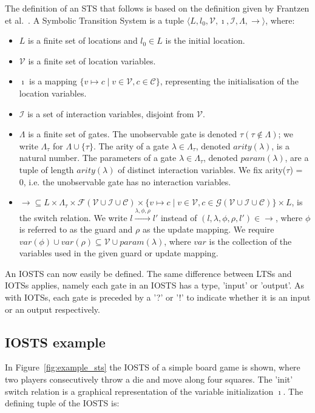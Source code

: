\begin{definition}
The definition of an STS that follows is based on the definition given by Frantzen et al.~\cite{Frantzen:Symbolic}. A Symbolic Transition System is a tuple $\langle L,l_0,\mathcal{V},\imath,\mathcal{I},\Lambda,\rightarrow\rangle$, where:
\begin{itemize}
\item $L$ is a finite set of locations and $l_0 \in L$ is the initial location.
\item $\mathcal{V}$ is a finite set of location variables.
\item $\imath$ is a mapping $\{v \mapsto c \mid v \in \mathcal{V}, c \in \mathcal{C}\}$, representing the initialisation of the location variables.
\item $\mathcal{I}$ is a set of interaction variables, disjoint from $\mathcal{V}$.
\item $\Lambda$ is a finite set of gates. The unobservable gate is denoted $\tau (\tau \notin \Lambda)$; we write $\Lambda_\tau$ for $\Lambda \cup \{\tau\}$. The arity of a gate $\lambda\in\Lambda_\tau$, denoted $arity(\lambda)$, is a natural number. The parameters of a gate $\lambda\in\Lambda_\tau$, denoted $param(\lambda)$, are a tuple of length $arity(\lambda)$ of distinct interaction variables. We fix arity($\tau$) = 0, i.e. the unobservable gate has no interaction variables.
\item $\rightarrow \subseteq L \times \Lambda_\tau \times \mathcal{F}(\mathcal{V} \cup \mathcal{I} \cup \mathcal{C}) \times \{v \mapsto c \mid v \in \mathcal{V}, c \in \mathcal{G}(\mathcal{V} \cup \mathcal{I} \cup \mathcal{C})\} \times L$, is the switch relation. We write $l\xrightarrow{\lambda,\phi,\rho}l'$ instead of $(l,\lambda,\phi,\rho,l')\in\rightarrow$, where $\phi$ is referred to as the guard and $\rho$ as the update mapping. We require $var(\phi) \cup var(\rho) \subseteq \mathcal{V} \cup param(\lambda)$, where $var$ is the collection of the variables used in the given guard or update mapping.
\end{itemize}
\end{definition}

An IOSTS can now easily be defined. The same difference between LTSs and IOTSs applies, namely each gate in an IOSTS has a type, 'input' or 'output'. As with IOTSs, each gate is preceded by a '?' or '!' to indicate whether it is an input or an output respectively.

\subsection{IOSTS example}\label{sec:sts_example}
In Figure~\ref{fig:example_sts} the IOSTS of a simple board game is shown, where two players consecutively throw a die and move along four squares. The 'init' switch relation is a graphical representation of the variable initialization $\imath$. The defining tuple of the IOSTS is:


